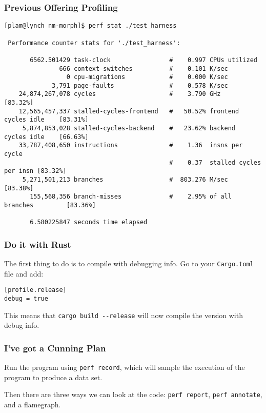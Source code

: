 \begin{frame}[fragile]
\frametitle{Previous Offering Profiling}

\begin{lstlisting}[basicstyle=\ttfamily\tiny]
[plam@lynch nm-morph]$ perf stat ./test_harness

 Performance counter stats for './test_harness':

       6562.501429 task-clock                #    0.997 CPUs utilized          
               666 context-switches          #    0.101 K/sec                  
                 0 cpu-migrations            #    0.000 K/sec                  
             3,791 page-faults               #    0.578 K/sec                  
    24,874,267,078 cycles                    #    3.790 GHz                     [83.32%]
    12,565,457,337 stalled-cycles-frontend   #   50.52% frontend cycles idle    [83.31%]
     5,874,853,028 stalled-cycles-backend    #   23.62% backend  cycles idle    [66.63%]
    33,787,408,650 instructions              #    1.36  insns per cycle        
                                             #    0.37  stalled cycles per insn [83.32%]
     5,271,501,213 branches                  #  803.276 M/sec                   [83.38%]
       155,568,356 branch-misses             #    2.95% of all branches         [83.36%]

       6.580225847 seconds time elapsed
\end{lstlisting} %

\end{frame}

\begin{frame}[fragile]
\frametitle{Do it with Rust}

The first thing to do is to compile with debugging info. Go to your \texttt{Cargo.toml} file and add:
\begin{verbatim}
[profile.release]
debug = true
\end{verbatim}

This means that \verb+cargo build --release+ will now compile the version with debug info.

\end{frame}

\begin{frame}
\frametitle{I've got a Cunning Plan}

Run the program using \texttt{perf record}, which will sample the execution of the program to produce a data set.


Then there are three ways we can look at the code: \texttt{perf report}, \texttt{perf annotate}, and a flamegraph.

\end{frame}


